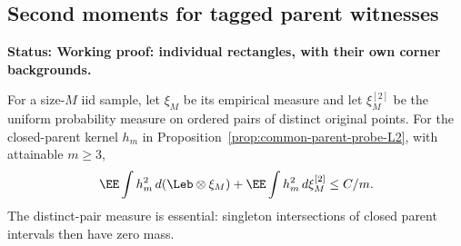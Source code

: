 \documentclass[11pt,letterpaper]{article}
\newcommand{\status}[1]{\textbf{Status: #1.}}
\begin{document}
\subsection{Second moments for tagged parent witnesses}
\label{sec:tagged-parent-second-moments}

\status{Working proof: individual rectangles, with their own corner backgrounds}

\begin{lemma}
\label{lem:tagged-parent-kernel-L2}
For a size-$M$ iid sample, let $\xi_M$ be its empirical measure
and let $\xi_M^{[2]}$ be the uniform probability measure on
ordered pairs of distinct original points. For the closed-parent
kernel $h_m$ in Proposition~\ref{prop:common-parent-probe-L2},
with attainable $m\ge3$,
\begin{equation}\label{eq:tagged-parent-kernel-L2}
 \EE\int h_m^2\,d(\Leb\otimes\xi_M)
       +\EE\int h_m^2\,d\xi_M^{[2]}
       \le C/m.
\end{equation}
The distinct-pair measure is essential: singleton intersections
of closed parent intervals then have zero mass.
\end{lemma}
\end{document}
